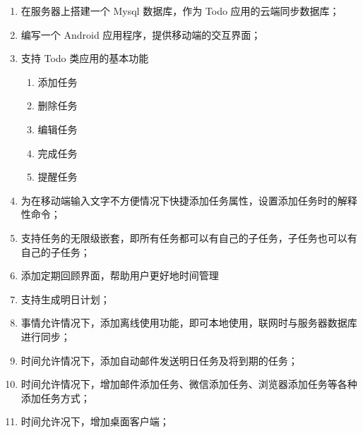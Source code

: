 \begin{enumerate}
    \item 在服务器上搭建一个 Mysql 数据库，作为 Todo 应用的云端同步数据库；
    \item 编写一个 Android 应用程序，提供移动端的交互界面；
    \item 支持 Todo 类应用的基本功能
        \begin{enumerate}
            \item 添加任务
            \item 删除任务
            \item 编辑任务
            \item 完成任务
            \item 提醒任务
        \end{enumerate}
    \item 为在移动端输入文字不方便情况下快捷添加任务属性，设置添加任务时的解释性命令；
    \item 支持任务的无限级嵌套，即所有任务都可以有自己的子任务，子任务也可以有自己的子任务；
    \item 添加定期回顾界面，帮助用户更好地时间管理
    \item 支持生成明日计划；
    \item 事情允许情况下，添加离线使用功能，即可本地使用，联网时与服务器数据库进行同步；
    \item 时间允许情况下，添加自动邮件发送明日任务及将到期的任务；
    \item 时间允许情况下，增加邮件添加任务、微信添加任务、浏览器添加任务等各种添加任务方式；
    \item 时间允许况下，增加桌面客户端；
\end{enumerate}
